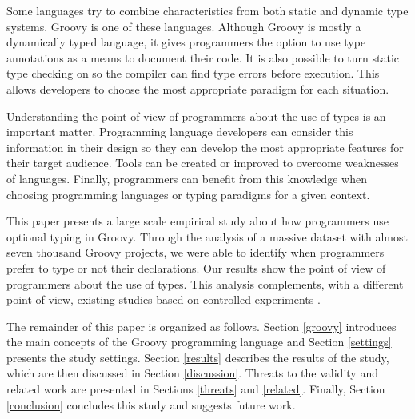 \documentclass[]{sigplanconf}
\begin{document}
Some languages try to combine characteristics from both static and dynamic type systems.
Groovy \cite{groovy} is one of these languages.
Although Groovy is mostly a dynamically typed language, it gives programmers the option to use type annotations as a means to document their code.
It is also possible to turn static type checking on so the compiler can find type errors before execution.
This allows developers to choose the most appropriate paradigm for each situation.

Understanding the point of view of programmers about the use of types is an important matter.
Programming language developers can consider this information in their design so they can develop the most appropriate features for their target audience.
Tools can be created or improved to overcome weaknesses of languages. 
Finally, programmers can benefit from this knowledge when choosing programming languages or typing paradigms for a given context.

This paper presents a large scale empirical study about how programmers use optional typing in Groovy.
Through the analysis of a massive dataset with almost seven thousand Groovy projects, we were able to identify when programmers prefer to type or not their declarations.
Our results show the point of view of programmers about the use of types.
This analysis complements, with a different point of view, existing studies based on controlled experiments \cite{Hanenberg13, ruby_vs_druby, experiment_with_purity, hanenberg_icpc, mayer2012static, Gannon77, Prechelt98}. 


The remainder of this paper is organized as follows. 
Section \ref{groovy} introduces the main concepts of the Groovy programming language and Section \ref{settings} presents the study settings.
Section \ref{results} describes the results of the study, which are then discussed in Section \ref{discussion}.
Threats to the validity and related work are presented in Sections \ref{threats} and \ref{related}.
Finally, Section \ref{conclusion} concludes this study and suggests future work.
\end{document}
